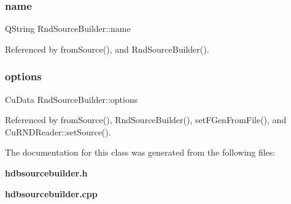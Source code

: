 \subsubsection{name}
{\footnotesize\ttfamily Q\+String Rnd\+Source\+Builder\+::name}



Referenced by from\+Source(), and Rnd\+Source\+Builder().

\mbox{\label{classRndSourceBuilder_a2fefb5c107ecfa8f1cb5b4ede08cf825}} 
\subsubsection{options}
{\footnotesize\ttfamily Cu\+Data Rnd\+Source\+Builder\+::options}



Referenced by from\+Source(), Rnd\+Source\+Builder(), set\+F\+Gen\+From\+File(), and Cu\+R\+N\+D\+Reader\+::set\+Source().



The documentation for this class was generated from the following files\+:\begin{DoxyCompactItemize}
\item 
\textbf{ hdbsourcebuilder.\+h}\item 
\textbf{ hdbsourcebuilder.\+cpp}\end{DoxyCompactItemize}
